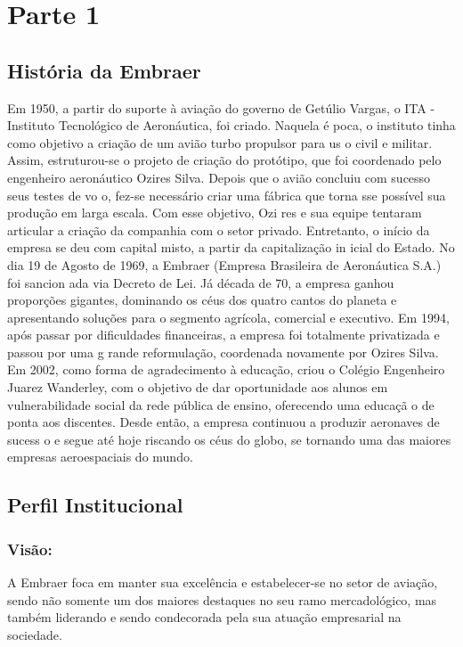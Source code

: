 
\chapter{Parte 1}
\section{História da Embraer}
Em 1950, a partir do suporte à aviação do governo de Getúlio
Vargas, o ITA - Instituto Tecnológico de Aeronáutica, foi criado. Naquela é
poca, o instituto tinha como objetivo a criação de um avião turbo propulsor para us
o civil e militar. Assim, estruturou-se o projeto de criação do protótipo, que foi coordenado 
pelo engenheiro aeronáutico Ozires Silva. Depois que o avião concluiu com sucesso seus testes de vo
o, fez-se necessário criar uma fábrica que torna
sse possível sua produção em larga escala. 
Com esse objetivo, Ozi
res e sua equipe tentaram articular a criação da companhia com 
o  setor privado. Entretanto, o início da empresa se deu com capital misto, a partir da capitalização in
icial do Estado. No dia 19 de Agosto de 1969, a Embraer (Empresa Brasileira de Aeronáutica S.A.) foi sancion
ada via Decreto de Lei. Já década de 70, a empresa ganhou proporções gigantes, dominando os céus dos quatro cantos
do planeta e apresentando soluções para o segmento agrícola, comercial e executivo.
Em 1994, após passar por 
dificuldades financeiras, a empresa foi
totalmente privatizada e passou por uma g
rande reformulação, coordenada novamente por Ozires
Silva. Em 2002, como forma de agradecimento à educação, criou o 
Colégio Engenheiro Juarez Wanderley, com o objetivo de dar oportunidade aos 
alunos em vulnerabilidade social da rede pública de ensino, oferecendo uma educaçã
o de ponta aos discentes. Desde então, a empresa continuou a produzir aeronaves de sucess
o e segue até hoje riscando os céus do globo, se tornando uma das maiores empresas aeroespaciais do mundo.



\section{Perfil Institucional}

\subsection{Visão:}
	A Embraer foca em manter sua excelência e estabelecer-se no setor de aviação, sendo não somente um dos maiores destaques no seu ramo mercadológico, mas também liderando e sendo condecorada pela sua atuação empresarial na sociedade.
	
